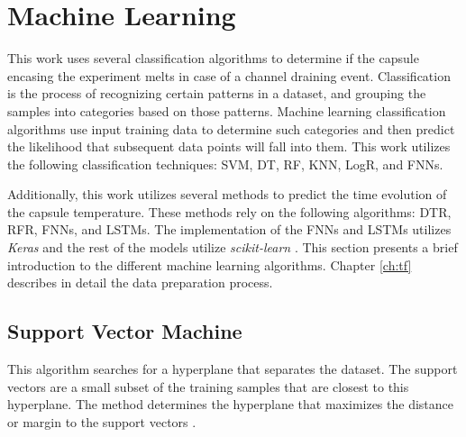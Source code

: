 \section{Machine Learning}

This work uses several classification algorithms to determine if the capsule encasing the experiment melts in case of a channel draining event.
Classification is the process of recognizing certain patterns in a dataset, and grouping the samples into categories based on those patterns.
Machine learning classification algorithms use input training data to determine such categories and then predict the likelihood that subsequent data points will fall into them.
This work utilizes the following classification techniques: \Gls*{SVM}, \Gls*{DT}, \Gls*{RF}, \Gls*{KNN}, \Gls*{LogR}, and \Glspl*{FNN}.

Additionally, this work utilizes several methods to predict the time evolution of the capsule temperature.
These methods rely on the following algorithms: \Gls*{DTR}, \Gls*{RFR}, \Glspl*{FNN}, and \Glspl*{LSTM}.
The implementation of the FNNs and LSTMs utilizes \textit{Keras} \cite{chollet_keras_2015} and the rest of the models
utilize \textit{scikit-learn} \cite{pedregosa_scikit-learn_2011}.
This section presents a brief introduction to the different machine learning algorithms.
Chapter \ref{ch:tf} describes in detail the data preparation process.


\subsection{Support Vector Machine}


This algorithm searches for a hyperplane that separates the dataset.
The support vectors are a small subset of the training samples that are closest to this hyperplane.
The method determines the hyperplane that maximizes the distance or margin to the support vectors \cite{pedregosa_scikit-learn_2011}.

